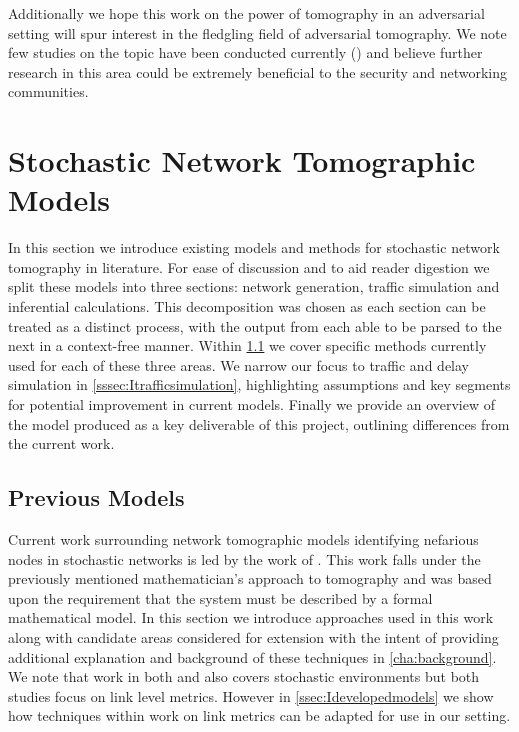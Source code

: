 Additionally we hope this work on the power of tomography in an adversarial setting will spur interest in the fledgling field of adversarial tomography. We note few studies on the topic have been conducted currently (\cite{he_network_2021}) and believe further research in this area could be extremely beneficial to the security and networking communities.

\section{Stochastic Network Tomographic Models}
\label{sec:Imodels}

In this section we introduce existing models and methods for stochastic network tomography in literature. For ease of discussion and to aid reader digestion we split these models into three sections: network generation, traffic simulation and inferential calculations. This decomposition was chosen as each section can be treated as a distinct process, with the output from each able to be parsed to the next in a context-free manner. Within \cref{ssec:Icurrentmodels} we cover specific methods currently used for each of these three areas. We narrow our focus to traffic and delay simulation in \cref{sssec:Itrafficsimulation}, highlighting assumptions and key segments for potential improvement in current models. Finally we provide an overview of the model produced as a key deliverable of this project, outlining differences from the current work.

\subsection{Previous Models}
\label{ssec:Icurrentmodels}

Current work surrounding network tomographic models identifying nefarious nodes in stochastic networks is led by the work of \cite{barnes_stochastic_2020}. This work falls under the previously mentioned mathematician's approach to tomography and was based upon the requirement that the system must be described by a formal mathematical model. In this section we introduce approaches used in this work along with candidate areas considered for extension with the intent of providing additional explanation and background of these techniques in \cref{cha:background}. We note that work in both \cite{he_fisher_2015} and \cite{kolar_distributed_2020} also covers stochastic environments but both studies focus on link level metrics. However in \cref{ssec:Idevelopedmodels} we show how techniques within work on link metrics can be adapted for use in our setting.


